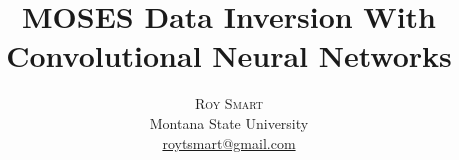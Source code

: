 \documentclass[twoside]{article}
\title{\vspace{-15mm}\fontsize{24pt}{10pt}\selectfont\textbf{MOSES Data Inversion With Convolutional Neural Networks}} %
\author{
\large
\textsc{Roy Smart}\\[2mm] %
\normalsize Montana State University \\ %
\normalsize \href{mailto:roytsmart@gmail.com}{roytsmart@gmail.com} %
\vspace{-5mm}
}
\date{}
\begin{document}
\maketitle %

\thispagestyle{fancy} %



\begin{multicols}{2} %


\end{multicols}
\end{document}
